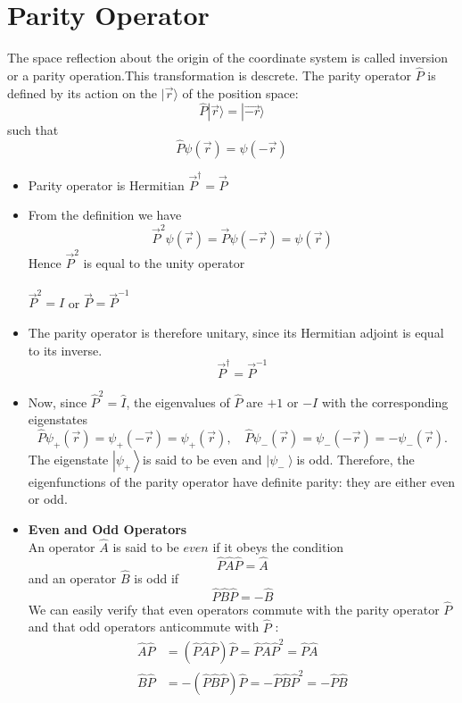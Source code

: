 \section{Parity Operator}
The space reflection about the origin of the coordinate system is called inversion or a parity operation.This transformation is descrete. The parity operator $\hat{P}$ is defined by its action on the $|\vec{r}\rangle$ of the position space:
$$\hat{P}|\vec{r}\rangle =|\vec{-r}\rangle$$
such that 
 $$\hat{P}\psi(\vec{r})=\psi(-\vec{r})$$
 \begin{note}
 	\begin{itemize}
 		\item Parity operator is Hermitian $\vec{P}^{\dagger}=\vec{P}$
 		\item From the definition we have\\
 		$$\vec{P}^2 \psi(\vec{r})=\vec{P}\psi(-\vec{r})=\psi(\vec{r})$$
 		Hence $\vec{P}^2$ is equal to the unity operator\\\\
 		$\vec{P}^2=I$ or $\vec{P}=\vec{P}^{-1}$\\
 		\item The parity operator is therefore unitary, since its Hermitian adjoint is equal to its inverse.\\
 		$$\vec{P}^{\dagger}=\vec{P}^{-1}$$ 
 		\item Now, since $\hat{P}^{2}=\hat{I}$, the eigenvalues of $\hat{P}$ are $+1$ or $-I$ with the corresponding eigenstates
 		$$
 		\hat{P} \psi_{+}(\vec{r})=\psi_{+}(-\vec{r})=\psi_{+}(\vec{r}), \quad \hat{P} \psi_{-}(\vec{r})=\psi_{-}(-\vec{r})=-\psi_{-}(\vec{r}) .
 		$$
 		The eigenstate $\left|\psi_{+}\right\rangle$is said to be even and $\left|\psi_{-}\right\rangle$is odd. Therefore, the eigenfunctions of the parity operator have definite parity: they are either even or odd.\\
 		\item \textbf{Even and Odd Operators}\\
 		An operator $\hat{A}$ is said to be $e v e n$ if it obeys the condition
 		$$
 		\hat{P} \hat{A} \hat{P}=\hat{A}
 		$$
 		and an operator $\hat{B}$ is odd if
 		$$
 		\hat{P} \hat{B} \hat{P}=-\hat{B}
 		$$
 		We can easily verify that even operators commute with the parity operator $\hat{P}$ and that odd operators anticommute with $\hat{P}$ :
 		$$
 		\begin{aligned}
 		\hat{A} \hat{P} &=(\hat{P} \hat{A} \hat{P}) \hat{P}=\hat{P} \hat{A} \hat{P}^{2}=\hat{P}\hat{A} \\
 		\hat{B} \hat{P} &=-(\hat{P} \hat{B} \hat{P}) \hat{P}=-\hat{P} \hat{B} \hat{P}^{2}=-\hat{P} \hat{B}
 		\end{aligned}
 		$$
 	\end{itemize}
 \end{note}

